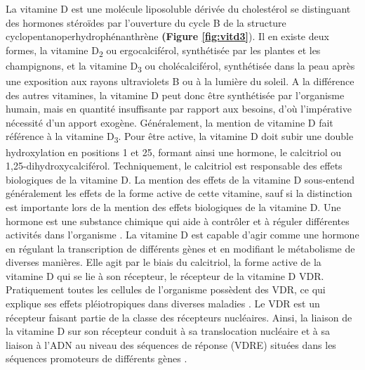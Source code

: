 \documentclass[
  a4paper,
  DIV=11,
  numbers=noendperiod,
  listof=totoc]{scrreprt}
\begin{document}
La vitamine D est une molécule liposoluble dérivée du cholestérol se
distinguant des hormones stéroïdes par l'ouverture du cycle B de la
structure cyclopentanoperhydrophénanthrène \autocite{Norman.2008}
\textbf{(Figure \ref{fig:vitd3}}). Il en existe deux formes, la vitamine
D\textsubscript{2} ou ergocalciférol, synthétisée par les plantes et les
champignons, et la vitamine D\textsubscript{3} ou cholécalciférol,
synthétisée dans la peau après une exposition aux rayons ultraviolets B
ou à la lumière du soleil. A la différence des autres vitamines, la
vitamine D peut donc être synthétisée par l'organisme humain, mais en
quantité insuffisante par rapport aux besoins, d'où l'impérative
nécessité d'un apport exogène. Généralement, la mention de vitamine D
fait référence à la vitamine D\textsubscript{3}. Pour être active, la
vitamine D doit subir une double hydroxylation en positions 1 et 25,
formant ainsi une hormone, le calcitriol ou 1,25-dihydroxycalciférol.
Techniquement, le calcitriol est responsable des effets biologiques de
la vitamine D. La mention des effets de la vitamine D sous-entend
généralement les effets de la forme active de cette vitamine, sauf si la
distinction est importante lors de la mention des effets biologiques de
la vitamine D. Une hormone est une substance chimique qui aide à
contrôler et à réguler différentes activités dans l'organisme
\autocite{Ellison.2021}. La vitamine D est capable d'agir comme une
hormone en régulant la transcription de différents gènes et en modifiant
le métabolisme de diverses manières. Elle agit par le biais du
calcitriol, la forme active de la vitamine D qui se lie à son récepteur,
le récepteur de la vitamine D \acs{VDR}. Pratiquement toutes les
cellules de l'organisme possèdent des VDR, ce qui explique ses effets
pléiotropiques dans diverses maladies
\autocite{Ellison.2021,Caprio.2017,Norman.2008}. Le \ac{VDR} est un
récepteur faisant partie de la classe des récepteurs nucléaires. Ainsi,
la liaison de la vitamine D sur son récepteur conduit à sa translocation
nucléaire et à sa liaison à l'ADN au niveau des séquences de réponse
(\acs{VDRE}) situées dans les séquences promoteurs de différents gènes
\autocite{Bouillon.2008}.
\end{document}
